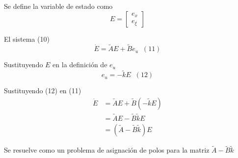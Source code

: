 Se define la variable de estado como
\[
    E = 
    \begin{bmatrix}
        e_{x} \\ e_{\xi}
    \end{bmatrix}
\]

El sistema (10)
\[
    \dot{E} = \tilde{A}E + \tilde{B}e_{u} \;\; (11)
\]

Sustituyendo \( E \) en la definición de \( e_{u} \)
\[
    e_{u} = -\tilde{k}E \;\; (12)
\]

Sustituyendo (12) en (11)
\[
    \begin{split}
        \dot{E} & = \tilde{A}E + \tilde{B}(-\tilde{k}E) \\ 
        & = \tilde{A}E - \tilde{B}\tilde{k}E \\
        & = (\tilde{A} - \tilde{B}\tilde{k})E
    \end{split}
\]

Se resuelve como un problema de asignación de polos para la matriz \( \tilde{A} - \tilde{B}\tilde{k} \)
